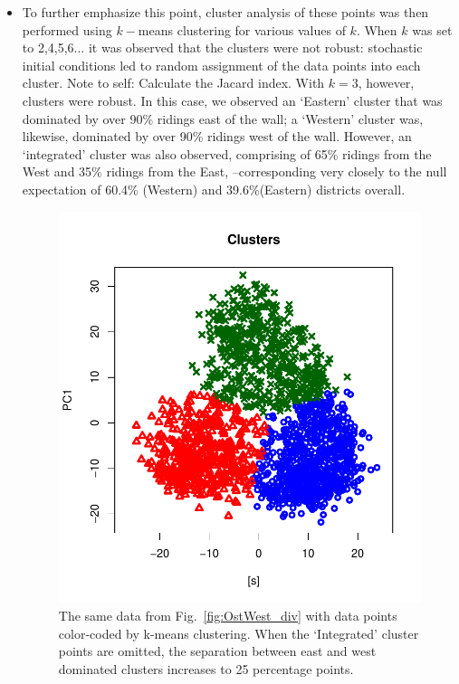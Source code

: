 \documentclass[amsmath,amssymb,nofootinbib,12pt,preprint]{revtex4}
\begin{document}
\begin{itemize}
\item To further emphasize this point, cluster analysis of these points was then performed using $k-$means clustering for various values of $k$. When $k$ was set to 2,4,5,6... it was observed that the clusters were not robust: stochastic initial conditions led to random assignment of the data points into each cluster. {\color{red} Note to self: Calculate the Jacard index.} With $k=3$, however, clusters were robust. In this case, we observed an `Eastern' cluster that was dominated by over 90\% ridings east of the wall; a `Western' cluster was, likewise, dominated by over 90\% ridings west of the wall. However, an `integrated' cluster was also observed, comprising of 65\% ridings from the West and 35\% ridings from the East, \---corresponding very closely to the null expectation of 60.4\% (Western) and 39.6\%(Eastern) districts overall.
\begin{figure}[t]%
\includegraphics[scale=.85]{../figures/clusters_Vote2}%
\caption{The same data from Fig.~\ref{fig:OstWest_div} with data points color-coded by k-means clustering. When the `Integrated' cluster points are omitted, the separation between east and west dominated clusters increases to 25 percentage points. } 
\label{fig:clusters}%
\end{figure}


\end{itemize}
\end{document}
